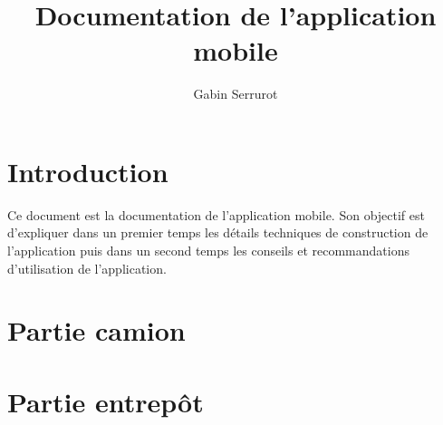 \documentclass[10pt,a4paper]{book}
\title{Documentation de l'application mobile}
\author{Gabin Serrurot}
\begin{document}
\maketitle

\tableofcontents

\chapter{Introduction}

Ce document est la documentation de l'application mobile. Son objectif est d'expliquer dans un premier temps les détails techniques de construction de l'application puis dans un second temps les conseils et recommandations d'utilisation de l'application.

\chapter{Partie camion}

\chapter{Partie entrepôt}
\end{document}

